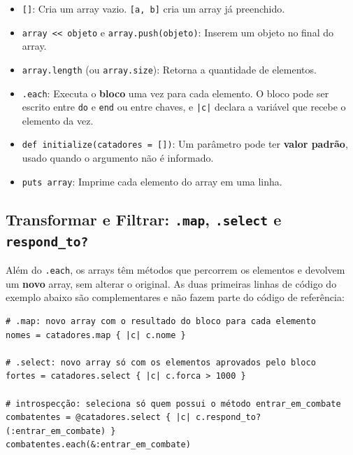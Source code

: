\begin{itemize}
    \item \texttt{[]}: Cria um array vazio. \texttt{[a, b]} cria um array já preenchido.

    \item \texttt{array <{}< objeto} e \texttt{array.push(objeto)}: Inserem um objeto no final do
    array.

    \item \texttt{array.length} (ou \texttt{array.size}): Retorna a quantidade de elementos.

    \item \texttt{.each}: Executa o \textbf{bloco} uma vez para cada elemento. O bloco pode ser
    escrito entre \texttt{do} e \texttt{end} ou entre chaves, e \texttt{|c|} declara a variável
    que recebe o elemento da vez.

    \item \texttt{def initialize(catadores = [])}: Um parâmetro pode ter \textbf{valor padrão},
    usado quando o argumento não é informado.

    \item \texttt{puts array}: Imprime cada elemento do array em uma linha.
\end{itemize}

\subsection{Transformar e Filtrar: \texttt{.map}, \texttt{.select} e \texttt{respond\_to?}}

Além do \texttt{.each}, os arrays têm métodos que percorrem os elementos e devolvem um
\textbf{novo} array, sem alterar o original. As duas primeiras linhas de código do exemplo
abaixo são complementares e não fazem parte do código de referência:

\begin{lstlisting}[style=ruby]
# .map: novo array com o resultado do bloco para cada elemento
nomes = catadores.map { |c| c.nome }

# .select: novo array só com os elementos aprovados pelo bloco
fortes = catadores.select { |c| c.forca > 1000 }

# introspecção: seleciona só quem possui o método entrar_em_combate
combatentes = @catadores.select { |c| c.respond_to?(:entrar_em_combate) }
combatentes.each(&:entrar_em_combate)
\end{lstlisting}

